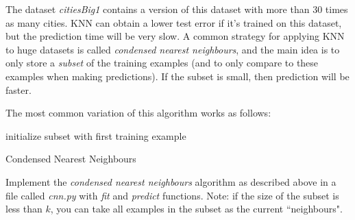 \documentclass{article}
\begin{document}
The dataset \emph{citiesBig1} contains a version of this dataset with more than 30 times as many cities. KNN can obtain a lower test error if it's trained on this dataset, but the prediction time will be very slow. A common strategy for applying KNN to huge datasets is called \emph{condensed nearest neighbours}, and the main idea is to only store a \emph{subset} of the training examples (and to only compare to these examples when making predictions). If the subset is small, then prediction will be faster.

The most common variation of this algorithm works as follows:

\begin{algorithm}[H]
 initialize subset with first training example\;
 \caption{Condensed Nearest Neighbours}
\end{algorithm}
Implement the \emph{condensed nearest neighbours} algorithm as described above in a file called \emph{cnn.py} with \emph{fit} and \emph{predict} functions. Note: if the size of the subset is less than $k$, you can take all examples in the subset as the current ``neighbours".
\end{document}

